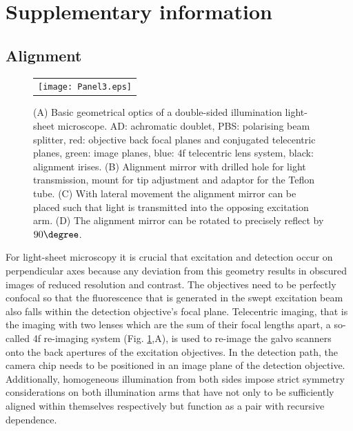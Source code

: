 \documentclass[12pt]{spieman}  %
\begin{document}
\pagebreak
\section{Supplementary information}

\subsection{Alignment}

\begin{figure}
   \begin{center}
   \begin{tabular}{c}
   \texttt{[image: Panel3.eps]}
   \end{tabular}
   \end{center}
   \caption{\label{fig:alignment} (A) Basic geometrical optics of a double-sided illumination light-sheet microscope. AD: achromatic doublet, PBS: polarising beam splitter, red: objective back focal planes and conjugated telecentric planes, green: image planes, blue: 4f telecentric lens system, black: alignment irises. (B) Alignment mirror with drilled hole for light transmission, mount for tip adjustment and adaptor for the Teflon tube. (C) With lateral movement the alignment mirror can be placed such that light is transmitted into the opposing excitation arm. (D) The alignment mirror can be rotated to precisely reflect by $90\degree$.} 
   \end{figure}

For light-sheet microscopy it is crucial that excitation and detection occur on perpendicular axes because any deviation from this geometry results in obscured images of reduced resolution and contrast. The objectives need to be perfectly confocal so that the fluorescence that is generated in the swept excitation beam also falls within the detection objective's focal plane. Telecentric imaging, that is the imaging with two lenses which are the sum of their focal lengths apart, a so-called 4f re-imaging system (Fig. \ref{fig:alignment},A), is used to re-image the galvo scanners onto the back apertures of the excitation objectives. In the detection path, the camera chip needs to be positioned in an image plane of the detection objective. Additionally, homogeneous illumination from both sides impose strict symmetry considerations on both illumination arms that have not only to be sufficiently aligned within themselves respectively but function as a pair with recursive dependence. 
\end{document}
